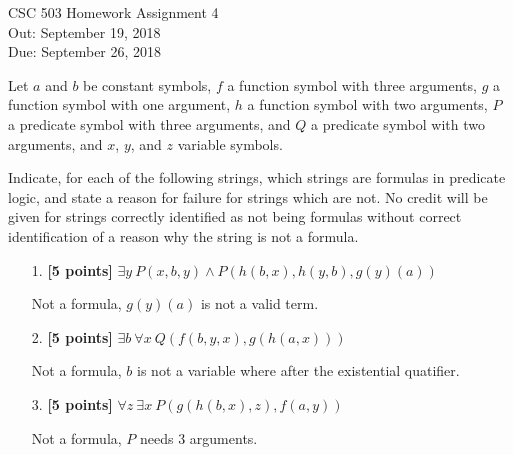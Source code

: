 \documentclass{article}
\begin{document}
\begin{center}
  {\LARGE CSC 503 Homework Assignment 4}\\[1pc]
  Out: September 19, 2018 \\
  Due: September 26, 2018 \\
\end{center}




\noindent
 Let $a$ and $b$ be constant symbols,
  $f$ a function symbol with three arguments,
  $g$ a function symbol with one argument,
  $h$ a function symbol with two arguments,
  $P$ a predicate symbol with three arguments, and
  $Q$ a predicate symbol with two arguments, and
  $x$, $y$, and $z$ variable symbols.

Indicate, for each of the following strings, which strings are
formulas in predicate logic, and state a reason for failure for
strings which are not.  No credit will be given for strings correctly
identified as not being formulas without correct identification of a
reason why the string is not a formula.

\begin{enumerate}
\item[1.] \textbf{[5 points]} 
    $\exists y\ P(x,b,y) \land P(h(b,x),h(y,b),g(y)(a))$

  \begin{answer}
    Not a formula, $g(y)(a)$ is not a valid term.
  \end{answer}
  \end{enumerate}

\begin{enumerate}
\item[2.] \textbf{[5 points]}
  $\exists b\ \forall x\ Q(f(b,y,x),g(h(a,x)))$

  \begin{answer}
    Not a formula, $b$ is not a variable where after the existential quatifier.
  \end{answer}
\end{enumerate}

\begin{enumerate}
\item[3.] \textbf{[5 points]}
    $\forall z\ \exists x\ P(g(h(b,x),z),f(a,y))$
    
  \begin{answer}
    Not a formula, $P$ needs 3 arguments.
  \end{answer}
\end{enumerate}
\end{document}
